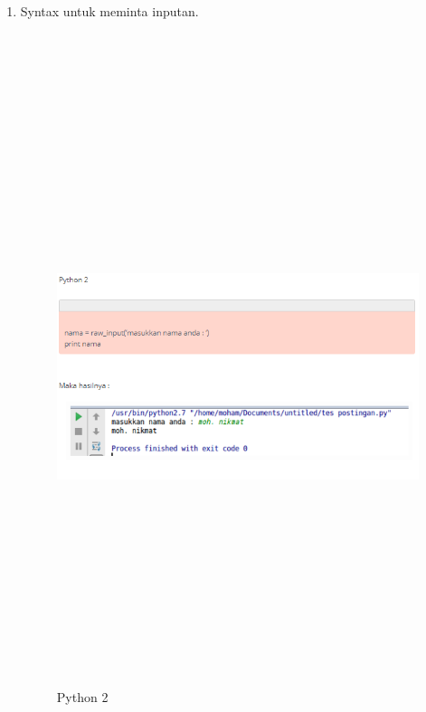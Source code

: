\begin{enumerate}
\item 
Syntax untuk meminta inputan.
\\
\\
\\
\begin{figure}[!htbp]
\centering
\includegraphics[width=15cm,height=18cm]{figures/3.PNG}
\caption{Python 2}
\label{penanda}
\end{figure}


\end{enumerate}

